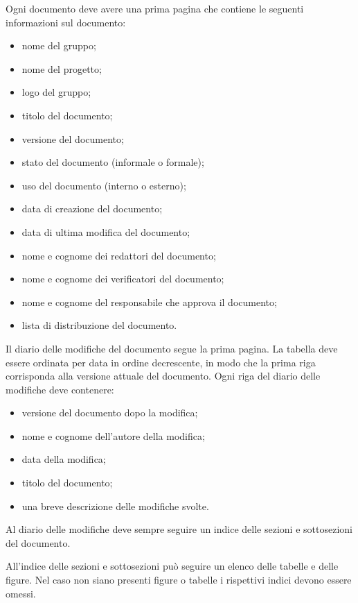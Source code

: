\documentclass[12pt,a4paper]{article}
\begin{document}
Ogni documento deve avere una prima pagina che contiene le seguenti informazioni sul documento:
\begin{itemize}
	\item nome del gruppo;
	\item nome del progetto;
	\item logo del gruppo;
	\item titolo del documento;
	\item versione del documento;
	\item stato del documento (informale o formale);
	\item uso del documento (interno o esterno);
	\item data di creazione del documento;
	\item data di ultima modifica del documento;
	\item nome e cognome dei redattori del documento;
	\item nome e cognome dei verificatori del documento;
	\item nome e cognome del responsabile che approva il documento;
	\item lista di distribuzione del documento.
\end{itemize}

Il diario delle modifiche del documento segue la prima pagina. La tabella deve essere ordinata per data in ordine decrescente, in modo che la prima riga corrisponda alla versione attuale del documento. Ogni riga del diario delle modifiche deve contenere:
\begin{itemize}
	\item versione del documento dopo la modifica;
	\item nome e cognome dell'autore della modifica;
	\item data della modifica;
	\item titolo del documento;
	\item una breve descrizione delle modifiche svolte.
\end{itemize}

Al diario delle modifiche deve sempre seguire un indice delle sezioni e sottosezioni del documento.

All'indice delle sezioni e sottosezioni può seguire un elenco delle tabelle e delle figure. Nel caso non siano presenti figure o tabelle i rispettivi indici devono essere omessi.
\end{document}
